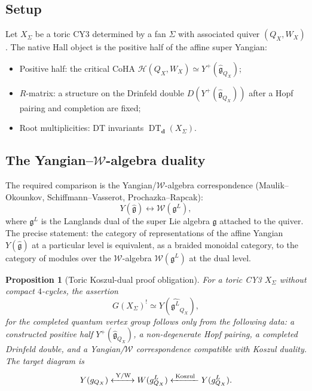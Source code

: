 \documentclass[11pt]{article}
\newtheorem{proposition}[theorem]{Proposition}
\theoremstyle{definition}
\theoremstyle{remark}
\DeclareMathOperator{\DT}{DT}
\newcommand{\fkg}{\mathfrak{g}}
\newcommand{\cH}{\mathcal{H}}
\newcommand{\cW}{\mathcal{W}}
\begin{document}
\subsection{Setup}

Let $X_\Sigma$ be a toric CY3 determined by a fan $\Sigma$ with
associated quiver $(Q_X, W_X)$. The native Hall object is the positive
half of the affine super Yangian:
\begin{itemize}
\item Positive half: the critical CoHA
$\cH(Q_X, W_X) \simeq Y^+(\widehat{\fkg}_{Q_X})$;
\item $R$-matrix: a structure on the Drinfeld double
$D(Y^+(\widehat{\fkg}_{Q_X}))$ after a Hopf pairing and completion are
fixed;
\item Root multiplicities: DT invariants $\DT_\mathbf{d}(X_\Sigma)$.
\end{itemize}

\subsection{The Yangian--$\cW$-algebra duality}

The required comparison is the Yangian/$\cW$-algebra correspondence
(Maulik--Okounkov, Schiffmann--Vasserot, Prochazka--Rapcak):
\begin{equation}\label{eq:yangian-w-duality}
Y(\widehat{\fkg}) \longleftrightarrow \cW(\fkg^L),
\end{equation}
where $\fkg^L$ is the Langlands dual of the super Lie algebra $\fkg$
attached to the quiver. The precise statement: the category of
representations of the affine Yangian $Y(\widehat{\fkg})$ at a
particular level is equivalent, as a braided monoidal category, to
the category of modules over the $\cW$-algebra $\cW(\fkg^L)$ at the
dual level.

\begin{proposition}[Toric Koszul-dual proof obligation]
\label{prop:toric-koszul-dual}
For a toric CY3 $X_\Sigma$ without compact $4$-cycles, the assertion
\begin{equation}\label{eq:toric-koszul}
G(X_\Sigma)^! \simeq Y(\widehat{\fkg^L}_{Q_X}),
\end{equation}
for the completed quantum vertex group follows only from the following
data: a constructed positive half $Y^+(\widehat{\fkg}_{Q_X})$, a
non-degenerate Hopf pairing, a completed Drinfeld double, and a
Yangian/$\cW$ correspondence compatible with Koszul duality. The target
diagram is
\[
Y(\widehat{\fkg}_{Q_X}) \xleftrightarrow{\;\text{Y/W}\;}
\cW(\fkg^L_{Q_X}) \xleftarrow{\;\text{Koszul}\;}
Y(\widehat{\fkg^L}_{Q_X}).
\]
\end{proposition}
\end{document}
